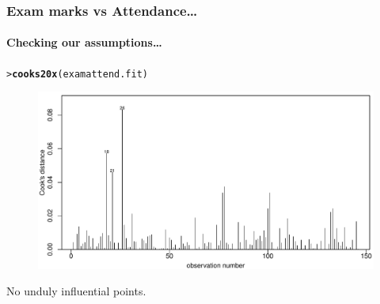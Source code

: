 \documentclass{beamer}\usepackage[]{graphicx}\usepackage[]{xcolor}
\makeatletter
\newcommand{\hlstd}[1]{\textcolor[rgb]{0.345,0.345,0.345}{#1}}%
\newcommand{\hlkwd}[1]{\textcolor[rgb]{0.737,0.353,0.396}{\textbf{#1}}}%
\newenvironment{kframe}{%
 \def\at@end@of@kframe{}%
 \ifinner\ifhmode%
  \def\at@end@of@kframe{\end{minipage}}%
  \begin{minipage}{\columnwidth}%
 \fi\fi%
 \def\FrameCommand##1{\hskip\@totalleftmargin \hskip-\fboxsep
 \colorbox{shadecolor}{##1}\hskip-\fboxsep
     \hskip-\linewidth \hskip-\@totalleftmargin \hskip\columnwidth}%
 \MakeFramed {\advance\hsize-\width
   \@totalleftmargin\z@ \linewidth\hsize
   \@setminipage}}%
 {\par\unskip\endMakeFramed%
 \at@end@of@kframe}
\newenvironment{knitrout}{}{} %
\makeatother
\begin{document}
\begin{frame}[fragile]
\frametitle{Exam marks vs Attendance\ldots}
\framesubtitle{Checking our assumptions\ldots} \medskip

\begin{knitrout}\scriptsize
{}\color{fgcolor}\begin{kframe}
\begin{alltt}
\hlstd{> }\hlkwd{cooks20x}\hlstd{(examattend.fit)}
\end{alltt}
\end{kframe}
\end{knitrout}



\begin{figure}
  \centering
  \includegraphics[scale=0.5]{figure/RC-H05-020}
\end{figure}

No unduly influential points.
\end{frame}
\end{document}
